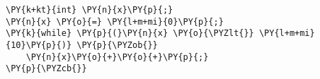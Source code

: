 \begin{Verbatim}[commandchars=\\\{\}]
\PY{k+kt}{int} \PY{n}{x}\PY{p}{;}
\PY{n}{x} \PY{o}{=} \PY{l+m+mi}{0}\PY{p}{;}
\PY{k}{while} \PY{p}{(}\PY{n}{x} \PY{o}{\PYZlt{}} \PY{l+m+mi}{10}\PY{p}{)} \PY{p}{\PYZob{}}
    \PY{n}{x}\PY{o}{+}\PY{o}{+}\PY{p}{;}
\PY{p}{\PYZcb{}}
\end{Verbatim}
